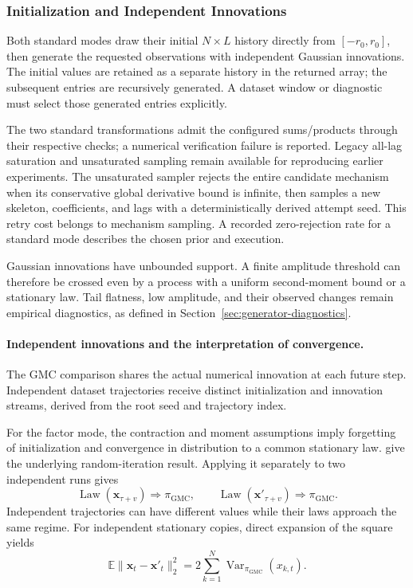 \subsubsection{Initialization and Independent Innovations}
Both standard modes draw their initial $N\times L$ history directly from
$[-r_0,r_0]$, then generate the requested observations with independent
Gaussian innovations. The initial values are retained as a separate history
in the returned array; the subsequent entries are recursively generated.
A dataset window or diagnostic must select those generated entries explicitly.

The two standard transformations admit the configured sums/products through
their respective checks; a numerical verification failure is reported.
Legacy all-lag saturation and unsaturated sampling remain available for
reproducing earlier experiments. The unsaturated sampler rejects the entire
candidate mechanism when its conservative global derivative bound is
infinite, then samples a new skeleton, coefficients, and lags with a
deterministically derived attempt seed. This retry cost belongs to mechanism
sampling. A recorded zero-rejection rate for a standard mode describes the
chosen prior and execution.

Gaussian innovations have unbounded support. A finite amplitude threshold
can therefore be crossed even by a process with a uniform second-moment
bound or a stationary law. Tail flatness, low amplitude, and their observed
changes remain empirical diagnostics, as defined in
Section~\ref{sec:generator-diagnostics}.

\paragraph{Independent innovations and the interpretation of convergence.}
\label{sec:implemented-shao-wu-independent-noise}
The GMC comparison shares the actual numerical innovation at each future
step. Independent dataset trajectories receive distinct initialization and
innovation streams, derived from the root seed and trajectory index.

For the factor mode, the contraction and moment assumptions imply
forgetting of initialization and convergence in distribution to a common
stationary law. \citet[Theorem~2, p.~427; discussion pp.~426--428]{wu2004iterated}
give the underlying random-iteration result. Applying it separately to two
independent runs gives
\begin{equation}
 \operatorname{Law}(\mathbf x_{\tau+v})\Rightarrow\pi_{\mathrm{GMC}},
 \qquad
 \operatorname{Law}(\mathbf x'_{\tau+v})\Rightarrow\pi_{\mathrm{GMC}}.
 \label{eq:implemented-gmc-independent-laws}
\end{equation}
Independent trajectories can have different values while their laws
approach the same regime. For independent stationary copies, direct
expansion of the square yields
\begin{equation}
 \mathbb E\|\mathbf x_t-\mathbf x'_t\|_2^2
 =2\sum_{k=1}^{N}\operatorname{Var}_{\pi_{\mathrm{GMC}}}(x_{k,t}).
 \label{eq:implemented-gmc-independent-distance}
\end{equation}
